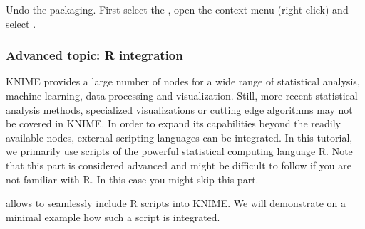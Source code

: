 \begin{task}
Undo the packaging. First select the , open the context menu (right-click) and select .
\end{task}

\subsubsection{Advanced topic: R integration}

KNIME provides a large number of nodes for a wide range of statistical analysis, machine learning, data processing and visualization. Still, more recent statistical analysis methods, specialized visualizations or cutting edge algorithms may not be covered in KNIME. In order to expand its capabilities beyond the readily available nodes, external scripting languages can be integrated. In this tutorial, we primarily use scripts of the powerful statistical computing language R. Note that this part is considered advanced and might be difficult to follow if you are not familiar with R. In this case you might skip this part.

 allows to seamlessly include R scripts into KNIME. We will demonstrate on a minimal example how such a script is integrated.

